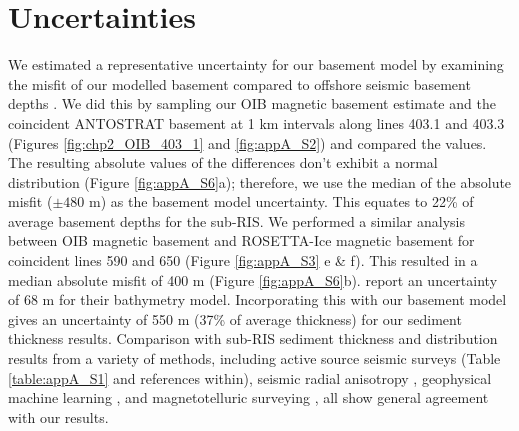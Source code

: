 \section{Uncertainties} \label{appA:text_S7}
We estimated a representative uncertainty for our basement model by examining the misfit of our modelled basement compared to offshore seismic basement depths \citep{brancolinidescriptive1995}. We did this by sampling our OIB magnetic basement estimate and the coincident ANTOSTRAT basement at 1 km intervals along lines 403.1 and 403.3 (Figures \ref{fig:chp2_OIB_403_1} and \ref{fig:appA_S2}) and compared the values. The resulting absolute values of the differences don’t exhibit a normal distribution (Figure \ref{fig:appA_S6}a); therefore, we use the median of the absolute misfit ($\pm480$ m) as the basement model uncertainty. This equates to 22\% of average basement depths for the sub-RIS. We performed a similar analysis between OIB magnetic basement and ROSETTA-Ice magnetic basement for coincident lines 590 and 650 (Figure \ref{fig:appA_S3} e \& f). This resulted in a median absolute misfit of 400 m (Figure \ref{fig:appA_S6}b). \citet{tintoross2019} report an uncertainty of 68 m for their bathymetry model. Incorporating this with our basement model gives an uncertainty of 550 m (37\% of average thickness) for our sediment thickness results. Comparison with sub-RIS sediment thickness and distribution results from a variety of methods, including active source seismic surveys (Table \ref{table:appA_S1} and references within), seismic radial anisotropy \citep{zhouradial2022}, geophysical machine learning \citep{lisedimentary2022}, and magnetotelluric surveying \citep{gustafsondynamic2022}, all show general agreement with our results.


